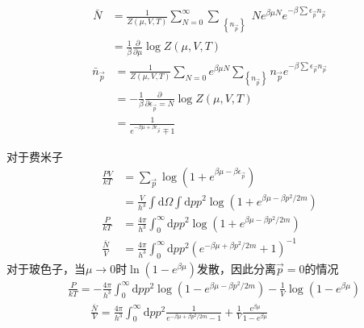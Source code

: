\documentclass[12pt, a4paper, oneside]{ctexbook}
\newcounter{#2}
\newcounter{#2}[#1]
\numberwithin{#2}{#1}
\begin{document}
          \begin{deduce}
            \begin{equation}
              \begin{aligned}
                \bar{N} & =\frac{1}{Z(\mu, V, T)} \sum_{N=0}^{\infty} \sum_{\substack{\left\{n_{\vec{p}}\right\}}} N e^{\beta \mu N} e^{-\beta \sum \epsilon_{\vec{p}} n_{\vec{p}}} \\
                & =\frac{1}{\beta} \frac{\partial}{\partial \mu} \log Z(\mu, V, T) 
                \end{aligned}
            \end{equation}
            \begin{equation}
              \begin{aligned}
                \bar{n}_{\vec{p}} & =\frac{1}{Z(\mu, V, T)} \sum_{N=0} e^{\beta \mu N} \sum_{\left\{n_{\vec{p}}\right\}} n_{\vec{p}} e^{-\beta \sum \epsilon_{\vec{p}} n_{\vec{p}}} \\
                & =-\frac{1}{\beta} \frac{\partial}{\partial \epsilon_{\vec{p}}=N} \log Z(\mu, V, T) \\
                & =\frac{1}{e^{-\beta \mu+\beta \epsilon_{\vec{p}}} \mp 1}
              \end{aligned}
            \end{equation}
          \end{deduce}
          \begin{deduce}
            对于费米子
            \begin{equation}
              \begin{aligned}
                \frac{P V}{k T} & =\sum_{\vec{p}} \log \left(1+e^{\beta \mu-\beta \epsilon_{\vec{p}}}\right) \\
                & =\frac{V}{h^3} \int \mathrm{d} \Omega \int \mathrm{d} p p^2 \log \left(1+e^{\beta \mu-\beta p^2 / 2 m}\right) \\
                \frac{P}{k T} & =\frac{4 \pi}{h^3} \int_0^{\infty} \mathrm{d} p p^2 \log \left(1+e^{\beta \mu-\beta p^2 / 2 m}\right) \\
                \frac{\bar{N}}{V} & =\frac{4 \pi}{h^3} \int_0^{\infty} \mathrm{d} p p^2\left(e^{-\beta \mu+\beta p^2 / 2 m}+1\right)^{-1}
                \end{aligned}
            \end{equation}
            对于玻色子，当\(\mu\rightarrow0\)时\(\ln(1-e^{\beta\mu})\)发散，因此分离\(\vec p=0\)的情况
            \begin{equation}
            \begin{aligned}
              & \frac{P}{k T}=-\frac{4 \pi}{h^3} \int_0^{\infty} \mathrm{d} p p^2 \log \left(1-e^{\beta \mu-\beta p^2 / 2 m}\right)-\frac{1}{V} \log \left(1-e^{\beta \mu}\right) \\
              & \qquad \frac{\bar{N}}{V}=\frac{4 \pi}{h^3} \int_0^{\infty} \mathrm{d} p p^2 \frac{1}{e^{-\beta \mu+\beta p^2 / 2 m}-1}+\frac{1}{V} \frac{e^{\beta \mu}}{1-e^{\beta \mu}}
              \end{aligned}
            \end{equation}
          \end{deduce}
\end{document}
